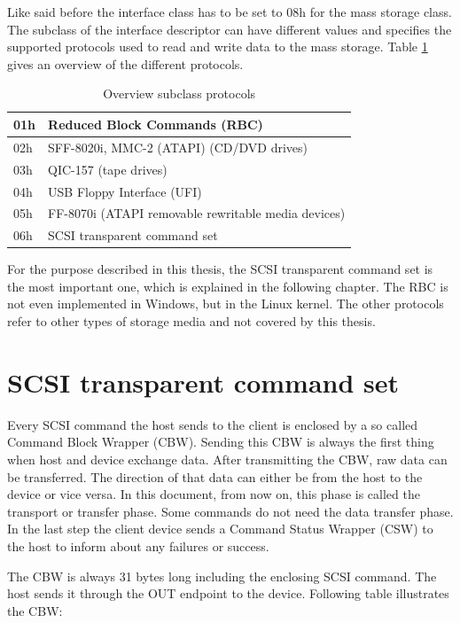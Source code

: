 Like said before the interface class has to be set to 08h for the mass storage class. The subclass of the interface descriptor can have different values and specifies the supported protocols used to read and write data to the mass storage. Table \ref{table:subclass} gives an overview of the different protocols.

\begin{table}[ht]
\caption{Overview subclass protocols \cite{usb_ms_jan}}
\centering
\begin{tabular}{|l|l|}
\hline\hline
01h & Reduced Block Commands (RBC) \\ \hline
02h & SFF-8020i, MMC-2 (ATAPI) (CD/DVD drives) \\ \hline
03h & QIC-157 (tape drives) \\ \hline
04h & USB Floppy Interface (UFI) \\ \hline
05h & FF-8070i (ATAPI removable rewritable media devices) \\ \hline
06h & SCSI transparent command set \\ \hline
\end{tabular}
\label{table:subclass}
\end{table}

For the purpose described in this thesis, the SCSI transparent command set is the most important one, which is explained in the following chapter. The RBC is not even implemented in Windows, but in the Linux kernel\cite{usb_ms_jan}. The other protocols refer to other types of storage media and not covered by this thesis.

\section{SCSI transparent command set}

Every SCSI command the host sends to the client is enclosed by a so called Command Block Wrapper (CBW). Sending this CBW is always the first thing when host and device exchange data. After transmitting the CBW, raw data can be transferred. The direction of that data can either be from the host to the device or vice versa. In this document, from now on, this phase is called the transport or transfer phase. Some commands do not need the data transfer phase. In the last step the client device sends a Command Status Wrapper (CSW) to the host to inform about any failures or success.

The CBW is always 31 bytes long including the enclosing SCSI command. The host sends it through the OUT endpoint to the device. Following table illustrates the CBW:

